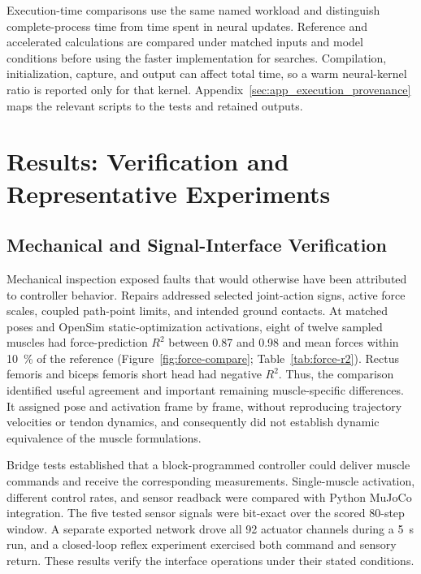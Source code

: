 Execution-time comparisons use the same named workload and distinguish complete-process time from time spent in neural updates. Reference and accelerated calculations are compared under matched inputs and model conditions before using the faster implementation for searches. Compilation, initialization, capture, and output can affect total time, so a warm neural-kernel ratio is reported only for that kernel. Appendix~\ref{sec:app_execution_provenance} maps the relevant scripts to the tests and retained outputs.




\section{Results: Verification and Representative Experiments}\label{sec:preliminary_sim_results}

\subsection{Mechanical and Signal-Interface Verification}\label{sec:crossengine_results}

Mechanical inspection exposed faults that would otherwise have been attributed to controller behavior. Repairs addressed selected joint-action signs, active force scales, coupled path-point limits, and intended ground contacts. At matched poses and OpenSim static-optimization activations, eight of twelve sampled muscles had force-prediction $R^2$ between 0.87 and 0.98 and mean forces within \qty{10}{\percent} of the reference (Figure~\ref{fig:force-compare}; Table~\ref{tab:force-r2}). Rectus femoris and biceps femoris short head had negative $R^2$. Thus, the comparison identified useful agreement and important remaining muscle-specific differences. It assigned pose and activation frame by frame, without reproducing trajectory velocities or tendon dynamics, and consequently did not establish dynamic equivalence of the muscle formulations.

Bridge tests established that a block-programmed controller could deliver muscle commands and receive the corresponding measurements. Single-muscle activation, different control rates, and sensor readback were compared with Python MuJoCo integration. The five tested sensor signals were bit-exact over the scored 80-step window. A separate exported network drove all 92 actuator channels during a \qty{5}{\second} run, and a closed-loop reflex experiment exercised both command and sensory return. These results verify the interface operations under their stated conditions.


